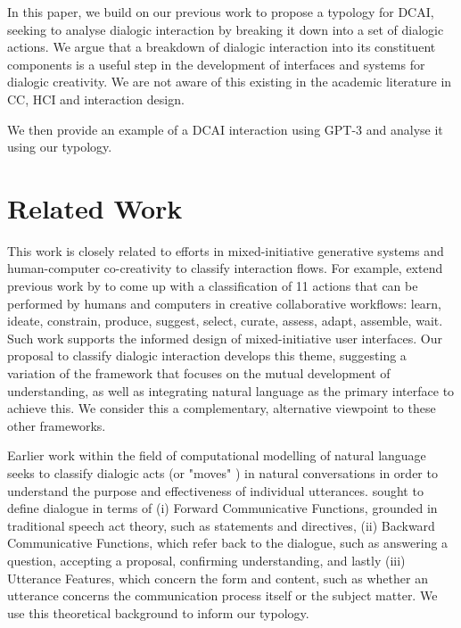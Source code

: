 \documentclass[acmlarge, nonacm, screen]{acmart} %
\begin{document}
In this paper, we build on our previous work to propose a typology for DCAI, seeking to analyse dialogic interaction by breaking it down into a set of dialogic actions. We argue that a breakdown of dialogic interaction into its constituent components is a useful step in the development of interfaces and systems for dialogic creativity. We are not aware of this existing in the academic literature in CC, HCI and interaction design. 

We then provide an example of a DCAI interaction using GPT-3 and analyse it using our typology. 

\section{Related Work}

This work is closely related to efforts in mixed-initiative generative systems and human-computer co-creativity to classify interaction flows. For example, \citet{mullermixed} extend previous work by \citep{spoto17} to come up with a classification of 11 actions that can be performed by humans and computers in creative collaborative workflows: learn, ideate, constrain, produce, suggest, select, curate, assess, adapt, assemble, wait. Such work supports the informed design of mixed-initiative user interfaces. Our proposal to classify dialogic interaction develops this theme, suggesting a variation of the framework that focuses on the mutual development of understanding, as well as integrating natural language as the primary interface to achieve this. We consider this a complementary, alternative viewpoint to these other frameworks. 

Earlier work within the field of computational modelling of natural language seeks to classify dialogic acts (or "moves" \citep{ginzburg201016}) in natural conversations in order to understand the purpose and effectiveness of individual utterances. \citet{core1997coding} sought to define dialogue in terms of (i) Forward Communicative Functions, grounded in traditional speech act theory, such as statements and directives, (ii) Backward Communicative Functions, which refer back to the dialogue, such as answering a question, accepting a proposal, confirming understanding, and lastly (iii) Utterance Features, which concern the form and content, such as whether an utterance concerns the communication process itself or the subject matter. We use this theoretical background to inform our typology.
\end{document}
